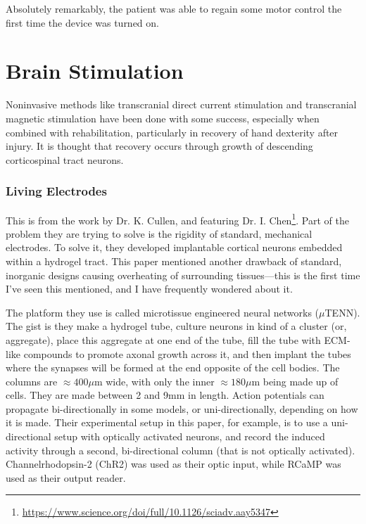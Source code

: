 \documentclass[12pt]{report}
\begin{document}
Absolutely remarkably, the patient was able to regain some motor control the first time the device was turned on. 




\chapter{Brain Stimulation}

Noninvasive methods like transcranial direct current stimulation and transcranial magnetic stimulation have been done with some success, especially when combined with rehabilitation, particularly in recovery of hand dexterity after injury. It is thought that recovery occurs through growth of descending corticospinal tract neurons. 

\subsection{Living Electrodes}

This is from the work by Dr. K. Cullen, and featuring Dr. I. Chen\footnote{\url{https://www.science.org/doi/full/10.1126/sciadv.aay5347}}. Part of the problem they are trying to solve is the rigidity of standard, mechanical electrodes. To solve it, they developed implantable cortical neurons embedded within a hydrogel tract. This paper mentioned another drawback of standard, inorganic designs causing overheating of surrounding tissues---this is the first time I've seen this mentioned, and I have frequently wondered about it.\newline

The platform they use is called microtissue engineered neural networks ($\mu$TENN). The gist is they make a hydrogel tube, culture neurons in kind of a cluster (or, aggregate), place this aggregate at one end of the tube, fill the tube with ECM-like compounds to promote axonal growth across it, and then implant the tubes where the synapses will be formed at the end opposite of the cell bodies. The columns are $\approx 400\mu$m wide, with only the inner $\approx 180\mu$m being made up of cells. They are made between 2 and 9mm in length. Action potentials can propagate bi-directionally in some models, or uni-directionally, depending on how it is made. Their experimental setup in this paper, for example, is to use a uni-directional setup with optically activated neurons, and record the induced activity through a second, bi-directional column (that is not optically activated). Channelrhodopsin-2 (ChR2) was used as their optic input, while RCaMP was used as their output reader. \newline
\end{document}
